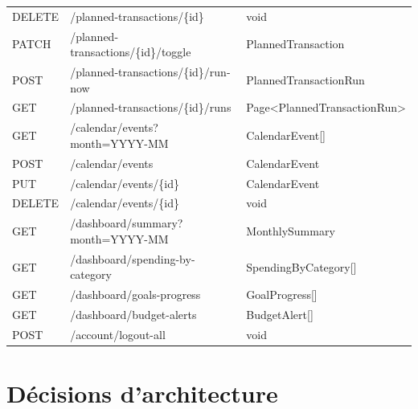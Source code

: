 \documentclass[12pt,a4paper]{article}
\begin{document}
\begin{longtable}{>{\small}L{1.9cm} >{\small\ttfamily}L{7.4cm} >{\small\ttfamily}L{4.5cm}}
DELETE & /planned-transactions/\{id\} & void \\
PATCH & /planned-transactions/\{id\}/toggle & PlannedTransaction \\
POST & /planned-transactions/\{id\}/run-now & PlannedTransactionRun \\
GET & /planned-transactions/\{id\}/runs & Page\textless{}\allowbreak PlannedTransactionRun\textgreater{} \\
\midrule
GET & /calendar/events?month=YYYY-MM & CalendarEvent[] \\
POST & /calendar/events & CalendarEvent \\
PUT & /calendar/events/\{id\} & CalendarEvent \\
DELETE & /calendar/events/\{id\} & void \\
\midrule
GET & /dashboard/summary?month=YYYY-MM & MonthlySummary \\
GET & /dashboard/spending-by-category & SpendingByCategory[] \\
GET & /dashboard/goals-progress & GoalProgress[] \\
GET & /dashboard/budget-alerts & BudgetAlert[] \\
\midrule
POST & /account/logout-all & void \\
\bottomrule
\end{longtable}

\section{Décisions d'architecture}
\end{document}
